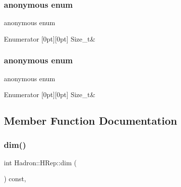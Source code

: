 \subsubsection{\texorpdfstring{anonymous enum}{anonymous enum}}
{\footnotesize\ttfamily anonymous enum}

\begin{DoxyEnumFields}{Enumerator}
[0pt][0pt]{}\mbox{\label{structHadron_1_1HRep_ab340b954bb47c3566f64d67ce55fa96fa075be4602db75ad5eac20da30e4571fd}} 
Size\+\_\+t&\\
\hline

\end{DoxyEnumFields}
\mbox{\label{structHadron_1_1HRep_ab340b954bb47c3566f64d67ce55fa96f}} 
\subsubsection{\texorpdfstring{anonymous enum}{anonymous enum}}
{\footnotesize\ttfamily anonymous enum}

\begin{DoxyEnumFields}{Enumerator}
[0pt][0pt]{}\mbox{\label{structHadron_1_1HRep_ab340b954bb47c3566f64d67ce55fa96fa075be4602db75ad5eac20da30e4571fd}} 
Size\+\_\+t&\\
\hline

\end{DoxyEnumFields}


\subsection{Member Function Documentation}
\mbox{\label{structHadron_1_1HRep_a7ed087e9f4edb84e1c537c6c39680b85}} 
\subsubsection{\texorpdfstring{dim()}{dim()}\hspace{0.1cm}{\footnotesize\ttfamily [1/3]}}
{\footnotesize\ttfamily int Hadron\+::\+H\+Rep\+::dim (\begin{DoxyParamCaption}{ }\end{DoxyParamCaption}) const\hspace{0.3cm}{\ttfamily [inline]}, {\ttfamily [virtual]}}



